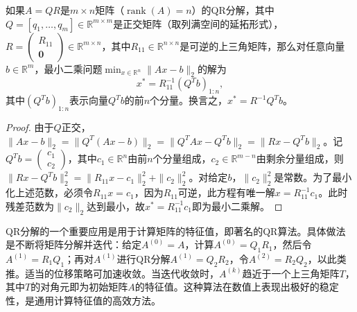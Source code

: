 \begin{proposition}
	如果$A=QR$是$m\times n$矩阵（$\operatorname{rank}(A)=n$）的QR分解，其中$Q=[q_1,\dots,q_m]\in \mathbb{R}^{m\times m}$是正交矩阵（取列满空间的延拓形式），$R=\begin{pmatrix}R_{11}\\ \mathbf{0}\end{pmatrix}\in \mathbb{R}^{m\times n}$，其中$R_{11}\in \mathbb{R}^{n\times n}$是可逆的上三角矩阵，那么对任意向量$b\in \mathbb{R}^m$，最小二乘问题$\min_{x\in \mathbb{R}^n}\|Ax-b\|_2$的解为 
	\[x^* = R_{11}^{-1}(Q^T b)_{1:n},\] 
	其中$(Q^T b)_{1:n}$表示向量$Q^T b$的前$n$个分量。换言之，$x^* = R^{-1} Q^T b$。
\end{proposition}
\begin{proof}
	由于$Q$正交，$\|Ax-b\|_2 = \|Q^T(Ax-b)\|_2 = \|Q^T Ax - Q^T b\|_2 = \|Rx - Q^T b\|_2$。记$Q^T b = \begin{pmatrix} c_1 \\ c_2 \end{pmatrix}$，其中$c_1\in \mathbb{R}^n$由前$n$个分量组成，$c_2\in \mathbb{R}^{m-n}$由剩余分量组成，则$\|Rx-Q^T b\|_2^2 = \|R_{11}x - c_1\|_2^2 + \|c_2\|_2^2$。对给定$b$，$\|c_2\|_2^2$是常数。为了最小化上述范数，必须令$R_{11}x = c_1$，因为$R_{11}$可逆，此方程有唯一解$x = R_{11}^{-1} c_1$。此时残差范数为$\|c_2\|_2$达到最小，故$x^* = R_{11}^{-1} c_1$即为最小二乘解。
\end{proof}

\begin{note}
	QR分解的一个重要应用是用于计算矩阵的特征值，即著名的QR算法。具体做法是不断将矩阵分解并迭代：给定$A^{(0)}=A$，计算$A^{(0)}=Q_1 R_1$，然后令$A^{(1)}=R_1 Q_1$；再对$A^{(1)}$进行QR分解$A^{(1)}=Q_2 R_2$，令$A^{(2)}=R_2 Q_2$，以此类推。适当的位移策略可加速收敛。当迭代收敛时，$A^{(k)}$趋近于一个上三角矩阵$T$，其中$T$的对角元即为初始矩阵$A$的特征值。这种算法在数值上表现出极好的稳定性，是通用计算特征值的高效方法。
\end{note}

